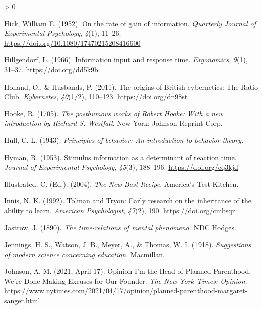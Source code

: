 \documentclass[
  oneside,
  12pt]{crumpbook}
\newlength{\cslhangindent}
\newenvironment{CSLReferences}[2] %
 {%
  \setlength{\parindent}{0pt}
  \ifodd #1 \everypar{\setlength{\hangindent}{\cslhangindent}}\ignorespaces\fi
  \ifnum #2 > 0
  \setlength{\parskip}{#2\baselineskip}
  \fi
 }%
 {}
\begin{document}
\begin{CSLReferences}{1}{0}
\leavevmode\hypertarget{ref-hickRateGainInformation1952}{}%
Hick, William E. (1952). On the rate of gain of information. \emph{Quarterly Journal of Experimental Psychology}, \emph{4}(1), 11--26. \url{https://doi.org/10.1080/17470215208416600}

\leavevmode\hypertarget{ref-hillgendorfInformationInputResponse1966}{}%
Hillgendorf, L. (1966). Information input and response time. \emph{Ergonomics}, \emph{9}(1), 31--37. \url{https://doi.org/dd5k9b}

\leavevmode\hypertarget{ref-hollandOriginsBritishCybernetics2011}{}%
Holland, O., \& Husbands, P. (2011). The origins of {British} cybernetics: The {Ratio Club}. \emph{Kybernetes}, \emph{40}(1/2), 110--123. \url{https://doi.org/dn98st}

\leavevmode\hypertarget{ref-hookePosthumousWorksRobert1705}{}%
Hooke, R. (1705). \emph{The posthumous works of {Robert Hooke}: {With} a new introduction by {Richard S}. {Westfall}}. {New York: Johnson Reprint Corp}.

\leavevmode\hypertarget{ref-hullPrinciplesBehaviorIntroduction1943}{}%
Hull, C. L. (1943). \emph{Principles of behavior: {An} introduction to behavior theory.}

\leavevmode\hypertarget{ref-hymanStimulusInformationDeterminant1953}{}%
Hyman, R. (1953). Stimulus information as a determinant of reaction time. \emph{Journal of Experimental Psychology}, \emph{45}(3), 188--196. \url{https://doi.org/cq3kjd}

\leavevmode\hypertarget{ref-illustratedNewBestRecipe2004}{}%
Illustrated, C. (Ed.). (2004). \emph{The {New Best Recipe}}. {America's Test Kitchen}.

\leavevmode\hypertarget{ref-innisTolmanTryonEarly1992}{}%
Innis, N. K. (1992). Tolman and {Tryon}: {Early} research on the inheritance of the ability to learn. \emph{American Psychologist}, \emph{47}(2), 190. \url{https://doi.org/cmbsqr}

\leavevmode\hypertarget{ref-jastrowTimerelationsMentalPhenomena1890}{}%
Jastrow, J. (1890). \emph{The time-relations of mental phenomena}. {NDC Hodges}.

\leavevmode\hypertarget{ref-jenningsSuggestionsModernScience1918}{}%
Jennings, H. S., Watson, J. B., Meyer, A., \& Thomas, W. I. (1918). \emph{Suggestions of modern science concerning education}. {Macmillan}.

\leavevmode\hypertarget{ref-johnsonOpinionHeadPlanned2021}{}%
Johnson, A. M. (2021, April 17). Opinion \textbar{} {I}'m the {Head} of {Planned Parenthood}. {We}'re {Done Making Excuses} for {Our Founder}. \emph{The New York Times: Opinion}. \url{https://www.nytimes.com/2021/04/17/opinion/planned-parenthood-margaret-sanger.html}


\end{CSLReferences}
\end{document}
